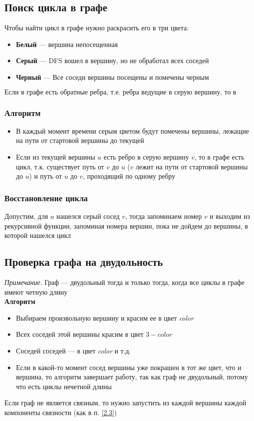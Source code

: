 \documentclass[a4paper]{article}
\begin{document}
\subsection{Поиск цикла в графе}
Чтобы найти цикл в графе нужно раскрасить его в три цвета:
\begin{itemize}
    \item \textbf{Белый} — вершина непосещенная
    \item \textbf{Серый} — DFS вошел в вершину, но не обработал всех соседей
    \item \textbf{Черный} — Все соседи вершины посещены и помечены черным
\end{itemize}
$$\boxed{\text{Если в графе есть обратные ребра, т.е. ребра ведущие в серую вершину, то в графе есть цикл}}$$
\subsubsection*{Алгоритм}
\begin{itemize}
    \item В каждый момент времени серым цветом будут помечены вершины, лежащие на пути \dfs от стартовой вершины до текущей
    \item Если из текущей вершины $u$ есть ребро в серую вершину $v$, то в графе есть цикл, т.к. существует путь от $v$ до $u$ ($v$ лежит на пути от стартовой вершины до $u$) и путь от $u$ до $v$, проходящий по одному ребру
\end{itemize}
\subsubsection*{Восстановление цикла}
Допустим, для $u$ нашелся серый сосед $v$, тогда запоминаем номер $v$ и выходим из рекурсивной функции, запоминая номера вершин, пока не дойдем до вершины, в которой нашелся цикл 
 
\subsection{Проверка графа на двудольность}
\textit{Примечание.} Граф — двудольный тогда и только тогда, когда все циклы в графе имеют четную длину\\[2mm]
\textbf{Алгоритм}
\begin{itemize}
    \item Выбираем произвольную вершину и красим ее в цвет \textit{color}
    \item Всех соседей этой вершины красим в цвет $3-color$
    \item Соседей соседей — в цвет \textit{color} и т.д.
    \item Если в какой-то момент сосед вершины уже покрашен в тот же цвет, что и вершина, то алгоритм завершает работу, так как граф не двудольный, потому что есть циклы нечетной длины
\end{itemize}
Если граф не является связным, то нужно запустить \dfs из каждой вершины каждой компоненты связности (как в п. \ref{2.3})
\end{document}
